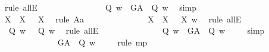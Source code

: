 \begin{isabellebody}
\ {\isacharparenleft}rule\ allE{\isacharparenright}\isanewline
\ \ \ \ \ \ \ \ \ \ \ \ \isamarkupfalse%
\ {}{\isacharcolon}\ {\isachardoublequoteopen}{\isacharparenleft}\isactrlbold {\isasymbox}{\isacharparenleft}{\isasymP}\ Q{\isacharparenright}{\isacharparenright}\ w\ {\isasymlongrightarrow}\ {\isacharparenleft}G\isactrlsup A\ {\isasymRrightarrow}\ Q{\isacharparenright}\ w{\isachardoublequoteclose}\ \isamarkupfalse%
\ simp\ \isanewline
\ \ \ \ \ \ \ \ \ \ \ \ \isamarkupfalse%
\ {\isachardoublequoteopen}{\isasymlfloor}\isactrlbold {\isasymforall}X{\isachardot}\ {\isasymP}\ X\ \isactrlbold {\isasymrightarrow}\ \isactrlbold {\isasymbox}{\isacharparenleft}{\isasymP}\ X{\isacharparenright}{\isasymrfloor}{\isachardoublequoteclose}\ \isamarkupfalse%
\ {\isacharparenleft}rule\ A{}a{\isacharparenright}\ %
\isanewline
\ \ \ \ \ \ \ \ \ \ \ \ \isamarkupfalse%
\ {\isachardoublequoteopen}{\isacharparenleft}\isactrlbold {\isasymforall}X{\isachardot}\ {\isasymP}\ X\ \isactrlbold {\isasymrightarrow}\ {\isacharparenleft}\isactrlbold {\isasymbox}{\isacharparenleft}{\isasymP}\ X{\isacharparenright}{\isacharparenright}{\isacharparenright}\ w{\isachardoublequoteclose}\ \isamarkupfalse%
\ {\isacharparenleft}rule\ allE{\isacharparenright}\isanewline
\ \ \ \ \ \ \ \ \ \ \ \ \isamarkupfalse%
\ {\isachardoublequoteopen}{\isasymP}\ Q\ w\ {\isasymlongrightarrow}\ {\isacharparenleft}\isactrlbold {\isasymbox}{\isacharparenleft}{\isasymP}\ Q{\isacharparenright}{\isacharparenright}\ w{\isachardoublequoteclose}\ \isamarkupfalse%
\ {\isacharparenleft}rule\ allE{\isacharparenright}\isanewline
\ \ \ \ \ \ \ \ \ \ \ \ \isamarkupfalse%
\ {\isachardoublequoteopen}{\isasymP}\ Q\ w\ {\isasymlongrightarrow}\ {\isacharparenleft}G\isactrlsup A\ {\isasymRrightarrow}\ Q{\isacharparenright}\ w{\isachardoublequoteclose}\ \isamarkupfalse%
\ {}\ \isamarkupfalse%
\ simp\ \isanewline
\ \ \ \ \ \ \ \ \ \ \ \ \isamarkupfalse%
\ {\isachardoublequoteopen}{\isacharparenleft}G\isactrlsup A\ {\isasymRrightarrow}\ Q{\isacharparenright}\ w{\isachardoublequoteclose}\ \isamarkupfalse%
\ {}\ \isamarkupfalse%
\ {\isacharparenleft}rule\ mp{\isacharparenright}\ %
\isanewline
\ \ \ \ \ \ \ \ \ \isamarkupfalse%
\isanewline
\ \ \ \ \ \ \ \ \ \ \ \isamarkupfalse%

\end{isabellebody}
